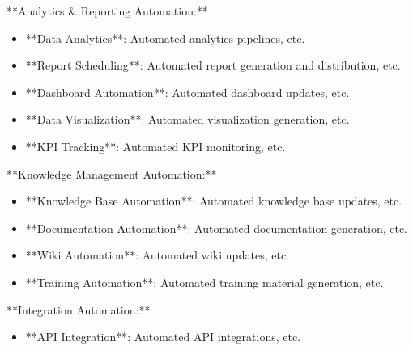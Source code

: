\documentclass[11pt,a4paper]{article}
\begin{document}
**Analytics \& Reporting Automation:**

\begin{itemize}
\item **Data Analytics**: Automated analytics pipelines, etc.
\end{itemize}

\begin{itemize}
\item **Report Scheduling**: Automated report generation and distribution, etc.
\end{itemize}

\begin{itemize}
\item **Dashboard Automation**: Automated dashboard updates, etc.
\end{itemize}

\begin{itemize}
\item **Data Visualization**: Automated visualization generation, etc.
\end{itemize}

\begin{itemize}
\item **KPI Tracking**: Automated KPI monitoring, etc.
\end{itemize}

**Knowledge Management Automation:**

\begin{itemize}
\item **Knowledge Base Automation**: Automated knowledge base updates, etc.
\end{itemize}

\begin{itemize}
\item **Documentation Automation**: Automated documentation generation, etc.
\end{itemize}

\begin{itemize}
\item **Wiki Automation**: Automated wiki updates, etc.
\end{itemize}

\begin{itemize}
\item **Training Automation**: Automated training material generation, etc.
\end{itemize}

**Integration Automation:**

\begin{itemize}
\item **API Integration**: Automated API integrations, etc.
\end{itemize}
\end{document}
